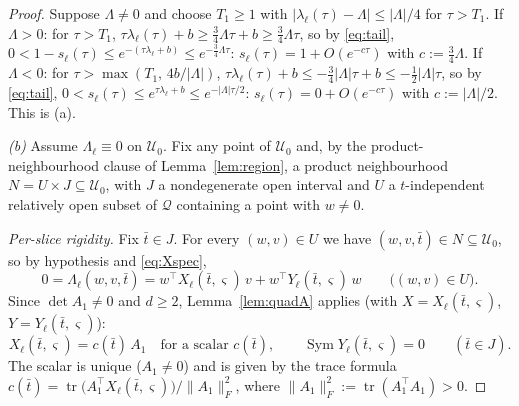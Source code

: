 \documentclass[11pt]{article}
\theoremstyle{definition}
\theoremstyle{remark}
\theoremstyle{plain}
\newcommand{\cQ}{\mathcal{Q}}
\newcommand{\cU}{\mathcal{U}}
\newcommand{\Sym}{\operatorname{Sym}}
\begin{document}
\begin{proof}
Suppose $\Lambda\neq0$ and choose $T_1\ge1$ with $|\lambda_\ell(\tau)-\Lambda|\le
|\Lambda|/4$ for $\tau>T_1$.  If $\Lambda>0$: for $\tau>T_1$,
$\tau\lambda_\ell(\tau)+b\ge\tfrac34\Lambda\tau+b\ge\tfrac34\Lambda\tau$, so by
\eqref{eq:tail},
$0<1-s_\ell(\tau)\le e^{-(\tau\lambda_\ell+b)}\le e^{-\frac34\Lambda\tau}$:
$s_\ell(\tau)=1+O(e^{-c\tau})$ with $c:=\tfrac34\Lambda$.  If $\Lambda<0$: for
$\tau>\max(T_1,\,4b/|\Lambda|)$,
$\tau\lambda_\ell(\tau)+b\le-\tfrac34|\Lambda|\tau+b\le-\tfrac12|\Lambda|\tau$, so by
\eqref{eq:tail}, $0<s_\ell(\tau)\le e^{\tau\lambda_\ell+b}\le e^{-|\Lambda|\tau/2}$:
$s_\ell(\tau)=0+O(e^{-c\tau})$ with $c:=|\Lambda|/2$.  This is (a).

\emph{(b)}  Assume $\Lambda_\ell\equiv0$ on $\cU_0$.  Fix any point of $\cU_0$ and, by
the product-neighbourhood clause of Lemma~\ref{lem:region}, a product neighbourhood
$N=U\times J\subseteq\cU_0$, with $J$ a nondegenerate open interval and $U$ a
$t$-independent relatively open subset of $\cQ$ containing a point with $w\neq0$.

\emph{Per-slice rigidity.}  Fix $\bar t\in J$.  For every $(w,v)\in U$ we have
$(w,v,\bar t)\in N\subseteq\cU_0$, so by hypothesis and \eqref{eq:Xspec},
\[
0=\Lambda_\ell(w,v,\bar t)
=w^\top X_\ell(\bar t,\varsigma)\,v+w^\top Y_\ell(\bar t,\varsigma)\,w
\qquad\big((w,v)\in U\big).
\]
Since $\det A_1\neq0$ and $d\ge2$, Lemma~\ref{lem:quadA} applies (with
$X=X_\ell(\bar t,\varsigma)$, $Y=Y_\ell(\bar t,\varsigma)$):
\[
X_\ell(\bar t,\varsigma)=c(\bar t)\,A_1\quad\text{for a scalar }c(\bar t),
\qquad\Sym Y_\ell(\bar t,\varsigma)=0\qquad(\bar t\in J).
\]
The scalar is unique ($A_1\neq0$) and is given by the trace formula
$c(\bar t)=\operatorname{tr}\!\big(A_1^\top X_\ell(\bar t,\varsigma)\big)/\|A_1\|_F^2$,
where $\|A_1\|_F^2:=\operatorname{tr}(A_1^\top A_1)>0$.


\end{proof}
\end{document}
